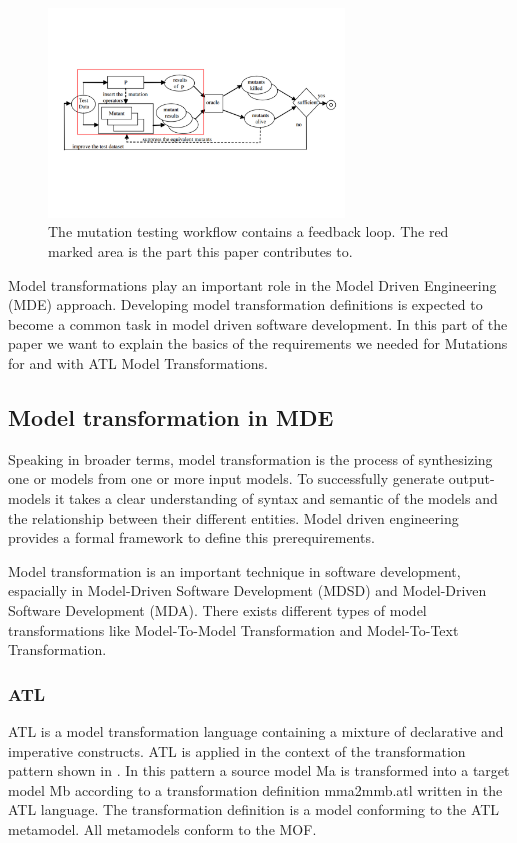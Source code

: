 \documentclass{llncs}
\begin{document}
\begin{figure}
	\centering
	\includegraphics[width=0.7\textwidth]{figures/Marked_Mutation_Process}
	\caption{The mutation testing workflow contains a feedback loop. The red marked area is the part this paper contributes to.\cite{MatMottu2006}}
	\label{fig:Marked_Mutation_Process}
\end{figure}

Model transformations play an important role in the Model Driven Engineering
(MDE) approach. Developing model transformation definitions is expected to
become a common task in model driven software development. \cite{atl:frederic}
In this part of the paper we want to explain the basics of the requirements we needed for Mutations for and with ATL Model Transformations.

\subsection{Model transformation in MDE}

Speaking in broader terms, model transformation is the process of synthesizing one or models from one or more input models. To successfully generate output-models it takes a clear understanding of syntax and semantic of the models and the relationship between their different entities. Model driven engineering provides a formal framework to define this prerequirements.\cite{Sendall:2003}

Model transformation is an important technique in software development, espacially in Model-Driven Software Development (MDSD) and Model-Driven Software Development (MDA). There exists different types of model transformations like Model-To-Model Transformation and Model-To-Text Transformation.  

\subsubsection{ATL}
ATL is a model transformation language containing a mixture of declarative and
imperative constructs. ATL is applied in the context of the
transformation pattern shown in \label{fig:overview_atl}. In this pattern a source model Ma is transformed into a target model Mb according to a transformation definition mma2mmb.atl written in the ATL language. The transformation definition is a model conforming to the ATL metamodel. All metamodels conform to the MOF.
\end{document}
